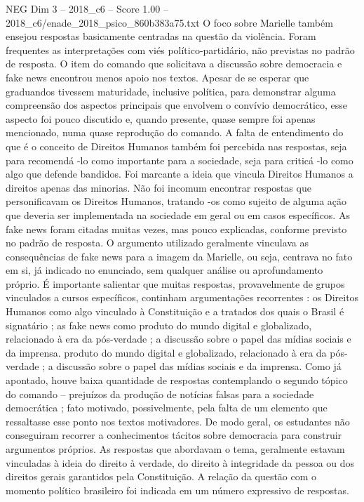 \begin{textsample}{NEG Dim 3 – 2018\_c6 – Score 1.00 – 2018\_c6/enade\_2018\_psico\_860b383a75.txt}
O foco sobre Marielle também ensejou respostas basicamente centradas na questão da violência.
Foram frequentes as interpretações com viés político-partidário, não previstas no padrão de resposta.
O item do comando que solicitava a discussão sobre democracia e fake news encontrou menos apoio nos textos.
Apesar de se esperar que graduandos tivessem maturidade, inclusive política, para demonstrar alguma compreensão dos aspectos principais que envolvem o convívio democrático, esse aspecto foi pouco discutido e, quando presente, quase sempre foi apenas mencionado, numa quase reprodução do comando.
A falta de entendimento do que é o conceito de Direitos Humanos também foi percebida nas respostas, seja para recomendá -lo como importante para a sociedade, seja para criticá -lo como algo que defende bandidos.
Foi marcante a ideia que vincula Direitos Humanos a direitos apenas das minorias.
Não foi incomum encontrar respostas que personificavam os Direitos Humanos, tratando -os como sujeito de alguma ação que deveria ser implementada na sociedade em geral ou em casos específicos.
As fake news foram citadas muitas vezes, mas pouco explicadas, conforme previsto no padrão de resposta.
O argumento utilizado geralmente vinculava as consequências de fake news para a imagem da Marielle, ou seja, centrava no fato em si, já indicado no enunciado, sem qualquer análise ou aprofundamento próprio.
É importante salientar que muitas respostas, provavelmente de grupos vinculados a cursos específicos, continham argumentações recorrentes : os Direitos Humanos como algo vinculado à Constituição e a tratados dos quais o Brasil é signatário ; as fake news como produto do mundo digital e globalizado, relacionado à era da pós-verdade ; a discussão sobre o papel das mídias sociais e da imprensa. produto do mundo digital e globalizado, relacionado à era da pós-verdade ; a discussão sobre o papel das mídias sociais e da imprensa.
Como já apontado, houve baixa quantidade de respostas contemplando o segundo tópico do comando – prejuízos da produção de notícias falsas para a sociedade democrática ; fato motivado, possivelmente, pela falta de um elemento que ressaltasse esse ponto nos textos motivadores.
De modo geral, os estudantes não conseguiram recorrer a conhecimentos tácitos sobre democracia para construir argumentos próprios.
As respostas que abordavam o tema, geralmente estavam vinculadas à ideia do direito à verdade, do direito à integridade da pessoa ou dos direitos gerais garantidos pela Constituição.
A relação da questão com o momento político brasileiro foi indicada em um número expressivo de respostas.

\end{textsample}
